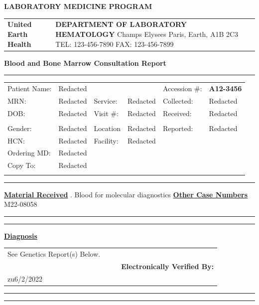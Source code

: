 \documentclass[11pt]{extarticle}
\begin{document}
\begin{center}{\LARGE \bf LABORATORY MEDICINE PROGRAM }\end{center}
\begin{tabular}{p{4cm} >{\centering \arraybackslash}p{11.59cm} p{10cm}}
{\Huge \bf United \newline Earth \newline Health} & {\bf DEPARTMENT OF LABORATORY HEMATOLOGY} \newline
123 Champs Elysees \newline Paris, Earth, A1B 2C3 \newline
TEL: 123-456-7890 \newline FAX: 123-456-7899
\end{tabular}
\begin{center}{\Large \bf Blood and Bone Marrow Consultation Report  \hrule }\end{center}
\begin{tabular}{p{2.5cm} p{3.75cm} p{2.5cm} p{3.75cm} p{2.5cm} p{3.75cm}}
Patient Name: & Redacted & & & Accession \#: & {\bf A12-3456} \\
MRN: & Redacted & Service: & Redacted & Collected: & Redacted\\
DOB: & Redacted & Visit \#: & Redacted & Received: &  Redacted \\
& & & & & \\
Gender: & Redacted & Location & Redacted & Reported: & Redacted \\
HCN: & Redacted & Facility: & Redacted & & \\
Ordering MD: & Redacted & & & & \\
Copy To: & Redacted &&&&\\
& & & & & \\
\end{tabular}
\hrule
\begin{raggedright} {\bf \underline {Material Received}} . Blood for molecular diagnostics 
\newline
{\bf \underline {Other Case Numbers}}\\
M22-08058 \newline
\hrule
\end{raggedright}
\hrule

{\Large \underline{\bf Diagnosis}}\\
\begin{tabular}{p{5cm} p{3cm} p{2cm} p{5.75cm}}
See Genetics Report(s) Below. \newline & & & \\
&  & & {\bf Electronically Verified By:} \\
zu6/2/2022
\end{tabular}
\hrule
\hrule
\end{document}
